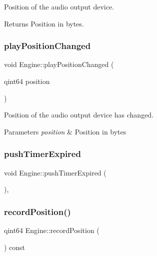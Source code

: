Position of the audio output device. \begin{DoxyReturn}{Returns}
Position in bytes. 
\end{DoxyReturn}
\hypertarget{class_engine_afe3298aca565219a67698bf7974a5257}{}\label{class_engine_afe3298aca565219a67698bf7974a5257} 
\subsubsection{\texorpdfstring{play\+Position\+Changed}{playPositionChanged}}
{\footnotesize\ttfamily void Engine\+::play\+Position\+Changed (\begin{DoxyParamCaption}\item[{qint64}]{position }\end{DoxyParamCaption})\hspace{0.3cm}{\ttfamily [signal]}}

Position of the audio output device has changed. 
\begin{DoxyParams}{Parameters}
{\em position} & Position in bytes \\
\hline
\end{DoxyParams}
\hypertarget{class_engine_a83047ff6af71dc546eeabccfde31d9aa}{}\label{class_engine_a83047ff6af71dc546eeabccfde31d9aa} 
\subsubsection{\texorpdfstring{push\+Timer\+Expired}{pushTimerExpired}}
{\footnotesize\ttfamily void Engine\+::push\+Timer\+Expired (\begin{DoxyParamCaption}{ }\end{DoxyParamCaption})\hspace{0.3cm}{\ttfamily [protected]}, {\ttfamily [slot]}}

\hypertarget{class_engine_a6d176811eefe7ae0979481862670003a}{}\label{class_engine_a6d176811eefe7ae0979481862670003a} 
\subsubsection{\texorpdfstring{record\+Position()}{recordPosition()}}
{\footnotesize\ttfamily qint64 Engine\+::record\+Position (\begin{DoxyParamCaption}{ }\end{DoxyParamCaption}) const\hspace{0.3cm}{\ttfamily [inline]}}

